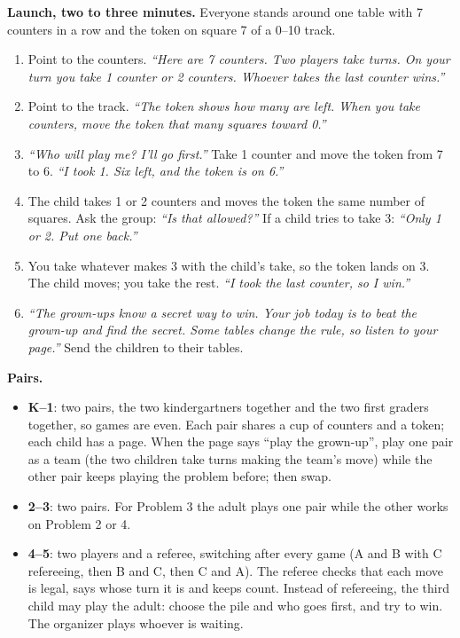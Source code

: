 \documentclass[10pt]{article}
\begin{document}
\textbf{Launch, two to three minutes.} Everyone stands around one table with
7 counters in a row and the token on square 7 of a 0--10 track.
\begin{enumerate}[leftmargin=1.4em]
\item Point to the counters. \textit{``Here are 7 counters. Two players take
turns. On your turn you take 1 counter or 2 counters. Whoever takes the last
counter wins.''}
\item Point to the track. \textit{``The token shows how many are left. When
you take counters, move the token that many squares toward 0.''}
\item \textit{``Who will play me? I'll go first.''} Take 1 counter and move the
token from 7 to 6. \textit{``I took 1. Six left, and the token is on 6.''}
\item The child takes 1 or 2 counters and moves the token the same number of
squares. Ask the group: \textit{``Is that allowed?''} If a child tries to take
3: \textit{``Only 1 or 2. Put one back.''}
\item You take whatever makes 3 with the child's take, so the token lands on
3. The child moves; you take the rest. \textit{``I took the last counter, so I
win.''}
\item \textit{``The grown-ups know a secret way to win. Your job today is to
beat the grown-up and find the secret. Some tables change the rule, so listen
to your page.''} Send the children to their tables.
\end{enumerate}

\textbf{Pairs.}
\begin{itemize}
\item \textbf{K--1}: two pairs, the two kindergartners together and the two
first graders together, so games are even. Each pair shares a cup of counters
and a token; each child has a page. When the page says ``play the
grown-up'', play one pair as a team (the two children take turns making the
team's move) while the other pair keeps playing the problem before; then swap.
\item \textbf{2--3}: two pairs. For Problem 3 the adult plays one pair while
the other works on Problem 2 or 4.
\item \textbf{4--5}: two players and a referee, switching after every game
(A and B with C refereeing, then B and C, then C and A). The referee checks
that each move is legal, says whose turn it is and keeps count. Instead of
refereeing, the third child may play the adult: choose the pile and who goes
first, and try to win. The organizer plays whoever is waiting.
\end{itemize}
\end{document}
